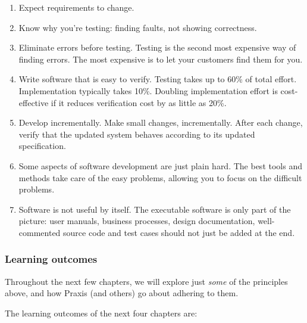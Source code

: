 \begin{enumerate}

 \item Expect requirements to change. 
 
 \item Know why you're testing: finding faults, not showing correctness.

 \item Eliminate errors before testing. Testing is the second most expensive way of finding errors. The most expensive is to let your customers find them for you.

 \item Write software that is easy to verify. Testing takes up to 60\% of total effort. Implementation typically takes 10\%. Doubling  implementation effort is cost-effective if it reduces verification cost by as little as 20\%.

 \item Develop incrementally. Make small changes, incrementally. After each change, verify that the updated system behaves according to its updated specification. 

 \item Some aspects of software development are just plain hard.  The best tools and methods take care of the easy problems, allowing you to focus on the difficult problems.

 \item Software is not useful by itself. The executable software is only part of the picture:   user manuals, business processes, design documentation, well-commented source code and test cases should not just be   added at the end.

\end{enumerate}

\subsubsection*{Learning outcomes}

Throughout the next few chapters, we will explore just {\em some} of the principles above, and how Praxis (and others) go about adhering to them. 

The learning outcomes of the next four chapters are:

